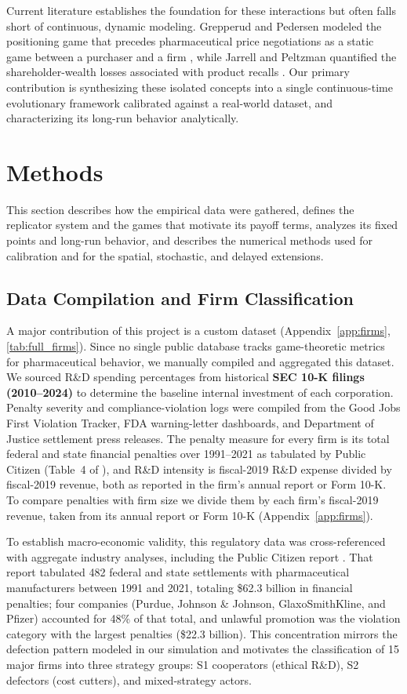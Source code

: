 \documentclass[10pt]{article}
\begin{document}
Current literature establishes the foundation for these interactions but often falls short of continuous, dynamic modeling. Grepperud and Pedersen modeled the positioning game that precedes pharmaceutical price negotiations as a static game between a purchaser and a firm \cite{grepperud2020}, while Jarrell and Peltzman quantified the shareholder-wealth losses associated with product recalls \cite{jarrell1985}. Our primary contribution is synthesizing these isolated concepts into a single continuous-time evolutionary framework calibrated against a real-world dataset, and characterizing its long-run behavior analytically.

\section{Methods}\label{sec:methods}
This section describes how the empirical data were gathered, defines the replicator system and the games that motivate its payoff terms, analyzes its fixed points and long-run behavior, and describes the numerical methods used for calibration and for the spatial, stochastic, and delayed extensions.

\subsection{Data Compilation and Firm Classification}\label{sec:data}
A major contribution of this project is a custom dataset (Appendix~\ref{app:firms}, \cref{tab:full_firms}). Since no single public database tracks game-theoretic metrics for pharmaceutical behavior, we manually compiled and aggregated this dataset. We sourced R\&D spending percentages from historical \textbf{SEC 10-K filings (2010--2024)} to determine the baseline internal investment of each corporation. Penalty severity and compliance-violation logs were compiled from the Good Jobs First Violation Tracker, FDA warning-letter dashboards, and Department of Justice settlement press releases. The penalty measure for every firm is its total federal and state financial penalties over 1991--2021 as tabulated by Public Citizen (Table~4 of \cite{publiccitizen2024}), and R\&D intensity is fiscal-2019 R\&D expense divided by fiscal-2019 revenue, both as reported in the firm's annual report or Form 10-K. To compare penalties with firm size we divide them by each firm's fiscal-2019 revenue, taken from its annual report or Form 10-K (Appendix~\ref{app:firms}).

To establish macro-economic validity, this regulatory data was cross-referenced with aggregate industry analyses, including the Public Citizen report \cite{publiccitizen2024}. That report tabulated 482 federal and state settlements with pharmaceutical manufacturers between 1991 and 2021, totaling \$62.3 billion in financial penalties; four companies (Purdue, Johnson \& Johnson, GlaxoSmithKline, and Pfizer) accounted for 48\% of that total, and unlawful promotion was the violation category with the largest penalties (\$22.3 billion). This concentration mirrors the defection pattern modeled in our simulation and motivates the classification of 15 major firms into three strategy groups: S1 cooperators (ethical R\&D), S2 defectors (cost cutters), and mixed-strategy actors.
\end{document}
